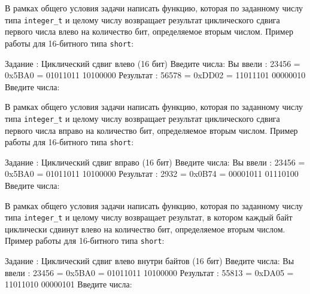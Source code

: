 
\begin{zztask}
В рамках общего условия задачи написать функцию, которая по заданному числу
типа \texttt{integer\_t} и целому числу возвращает результат циклического
сдвига первого числа влево на количество бит, определяемое вторым числом.
Пример работы для 16-битного типа \texttt{short}:
\begin{zzoutput}
  Задание \thezztask: Циклический сдвиг влево (16 бит)
  Введите числа: 
  Вы ввели  : 23456 = 0x5BA0 = 01011011 10100000
  Результат : 56578 = 0xDD02 = 11011101 00000010
  Введите числа: \zzuser{ }
\end{zzoutput}
\end{zztask}


\begin{zztask}
В рамках общего условия задачи написать функцию, которая по заданному числу
типа \texttt{integer\_t} и целому числу возвращает результат циклического
сдвига первого числа вправо на количество бит, определяемое вторым числом.
Пример работы для 16-битного типа \texttt{short}:
\begin{zzoutput}
  Задание \thezztask: Циклический сдвиг вправо (16 бит)
  Введите числа: 
  Вы ввели  : 23456 = 0x5BA0 = 01011011 10100000
  Результат :  2932 = 0x0B74 = 00001011 01110100
  Введите числа: \zzuser{ }
\end{zzoutput}
\end{zztask}


\begin{zztask}
В рамках общего условия задачи написать функцию, которая по заданному числу
типа \texttt{integer\_t} и целому числу возвращает результат, в котором каждый байт
циклически сдвинут влево на количество бит, определяемое вторым числом.
Пример работы для 16-битного типа \texttt{short}:
\begin{zzoutput}
  Задание \thezztask: Циклический сдвиг влево внутри байтов (16 бит)
  Введите числа: 
  Вы ввели  : 23456 = 0x5BA0 = 01011011 10100000
  Результат : 55813 = 0xDA05 = 11011010 00000101
  Введите числа: \zzuser{ }
\end{zzoutput}
\end{zztask}

